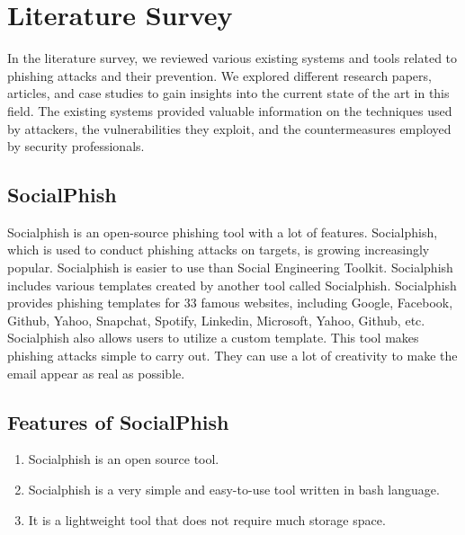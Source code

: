 \documentclass[openany]{report}
\begin{document}
\chapter{Literature Survey}

In the literature survey, we reviewed various existing systems and tools related to phishing attacks and their prevention. We explored different research papers, articles, and case studies to gain insights into the current state of the art in this field. The existing systems provided valuable information on the techniques used by attackers, the vulnerabilities they exploit, and the countermeasures employed by security professionals.

\section{SocialPhish}
Socialphish is an open-source phishing tool with a lot of features. Socialphish, which is used to conduct phishing attacks on targets, is growing increasingly popular. Socialphish is easier to use than Social Engineering Toolkit. Socialphish includes various templates created by another tool called Socialphish. Socialphish provides phishing templates for 33 famous websites, including Google, Facebook, Github, Yahoo, Snapchat, Spotify, Linkedin, Microsoft, Yahoo, Github, etc.
Socialphish also allows users to utilize a custom template. This tool makes phishing attacks simple to carry out. They can use a lot of creativity to make the email appear as real as possible.\\

\section{Features of SocialPhish}

\begin{enumerate}
    \item Socialphish is an open source tool.
    \item Socialphish is a very simple and easy-to-use tool written in bash language.
    \item It is a lightweight tool that does not require much storage space.
\end{enumerate}
\end{document}
